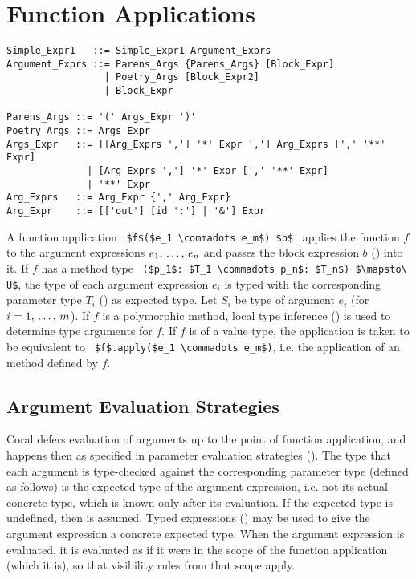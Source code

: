\section{Function Applications}
\label{sec:function-applications}

\syntax\begin{lstlisting}
Simple_Expr1   ::= Simple_Expr1 Argument_Exprs 
Argument_Exprs ::= Parens_Args {Parens_Args} [Block_Expr] 
                 | Poetry_Args [Block_Expr2]
                 | Block_Expr
                 
Parens_Args ::= '(' Args_Expr ')'
Poetry_Args ::= Args_Expr
Args_Expr   ::= [[Arg_Exprs ','] '*' Expr ','] Arg_Exprs [',' '**' Expr]
              | [Arg_Exprs ','] '*' Expr [',' '**' Expr]
              | '**' Expr
Arg_Exprs   ::= Arg_Expr {',' Arg_Expr}
Arg_Expr    ::= [['out'] [id ':'] | '&'] Expr
\end{lstlisting}

A function application ~\lstinline!$f$($e_1 \commadots e_m$) $b$!~ applies the function $f$ to the argument expressions $e_1 ,\, \ldots ,\, e_n$ and passes the block expression $b$ () into it. If $f$ has a method type ~\lstinline!($p_1$: $T_1 \commadots p_n$: $T_n$) $\mapsto\ U$!, the type of each argument expression $e_i$ is typed with the corresponding parameter type $T_i$ () as expected type. Let $S_i$ be type of argument $e_i$ (for $i = 1 ,\, \ldots ,\, m$). If $f$ is a polymorphic method, local type inference () is used to determine type arguments for $f$. If $f$ is of a value type, the application is taken to be equivalent to ~\lstinline!$f$.apply($e_1 \commadots e_m$)!, i.e. the application of an  method defined by $f$. 






\subsection{Argument Evaluation Strategies}
\label{sec:arg-eval-strategies}

Coral defers evaluation of arguments up to the point of function application, and happens then as specified in parameter evaluation strategies (). The type that each argument is type-checked against the corresponding parameter type (defined as follows) is the expected type of the argument expression, i.e. not its actual concrete type, which is known only after its evaluation. If the expected type is undefined, then  is assumed. Typed expressions () may be used to give the argument expression a concrete expected type. When the argument expression is evaluated, it is evaluated as if it were in the scope of the function application (which it is), so that visibility rules from that scope apply. 






